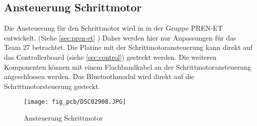 \subsection{Ansteuerung Schrittmotor}
\label{sec:stepperdriver}
Die Ansteuerung für den Schrittmotor wird in in der Gruppe PREN-ET entwickelt. 
(Siehe \ref{sec:pren-et} ) 
Daher werden hier nur Anpassungen für das Team 27 betrachtet. 
Die Platine mit der Schrittmotoransteuerung kann direkt auf das 
Controllerboard (siehe \ref{sec:control}) gesteckt werden.  Die weiteren 
Komponenten können mit einem Flachbandkabel an der Schrittmotoransteuerung 
angeschlossen werden. Das Bluetoothmodul wird direkt auf die 
Schrittmotorsteuerung gesteckt. 
\begin{figure}[h!]
    \centering
    \texttt{[image: fig\_pcb/DSC02908.JPG]}
    \caption{Ansteuerung Schrittmotor}
    \label{fig:dc}
\end{figure}

